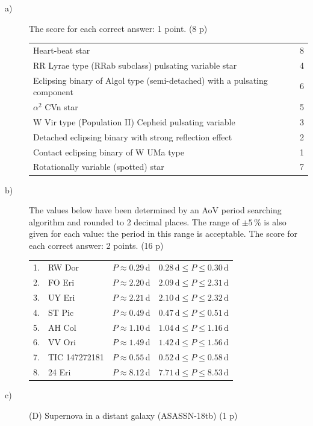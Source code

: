 \begin{description}
\item[a)] The score for each correct answer: 1 point. \hfill(8 p)

  \begin{center}
  \begin{tabular}{ll}
  Heart-beat star & 8 \\
  RR Lyrae type (RRab subclass) pulsating variable star & 4 \\
  Eclipsing binary of Algol type (semi-detached) with a pulsating component
    & 6 \\
  $\alpha^2$ CVn star & 5 \\
  W Vir type (Population II) Cepheid pulsating variable & 3 \\
  Detached eclipsing binary with strong reflection effect & 2 \\
  Contact eclipsing binary of W UMa type & 1 \\
  Rotationally variable (spotted) star & 7 \\
  \end{tabular}
  \end{center}
\item[b)] The values below have been determined by an AoV period searching
  algorithm and rounded to 2 decimal places. The range of $\pm 5$\,\% is also
  given for each value: the period in this range is acceptable. The score for
  each correct answer: 2 points. \hfill(16 p)

  \begin{center}
  \begin{tabular}{llll}
  1. & RW Dor & $P \approx 0.29$\,d
     & $0.28\,\mathrm{d} \le P \le 0.30\,\mathrm{d}$ \\
  2. & FO Eri & $P \approx 2.20$\,d
     & $2.09\,\mathrm{d} \le P \le 2.31\,\mathrm{d}$ \\
  3. & UY Eri & $P \approx 2.21$\,d
     & $2.10\,\mathrm{d} \le P \le 2.32\,\mathrm{d}$ \\
  4. & ST Pic & $P \approx 0.49$\,d
     & $0.47\,\mathrm{d} \le P \le 0.51\,\mathrm{d}$ \\
  5. & AH Col & $P \approx 1.10$\,d
     & $1.04\,\mathrm{d} \le P \le 1.16\,\mathrm{d}$ \\
  6. & VV Ori & $P \approx 1.49$\,d
     & $1.42\,\mathrm{d} \le P \le 1.56\,\mathrm{d}$ \\
  7. & TIC 147272181 & $P \approx 0.55$\,d
     & $0.52\,\mathrm{d} \le P \le 0.58\,\mathrm{d}$ \\
  8. & 24 Eri & $P \approx 8.12$\,d
     & $7.71\,\mathrm{d} \le P \le 8.53\,\mathrm{d}$ \\
  \end{tabular}
  \end{center}
\item[c)] (D) Supernova in a distant galaxy (ASASSN-18tb) \hfill(1 p)
\end{description}

